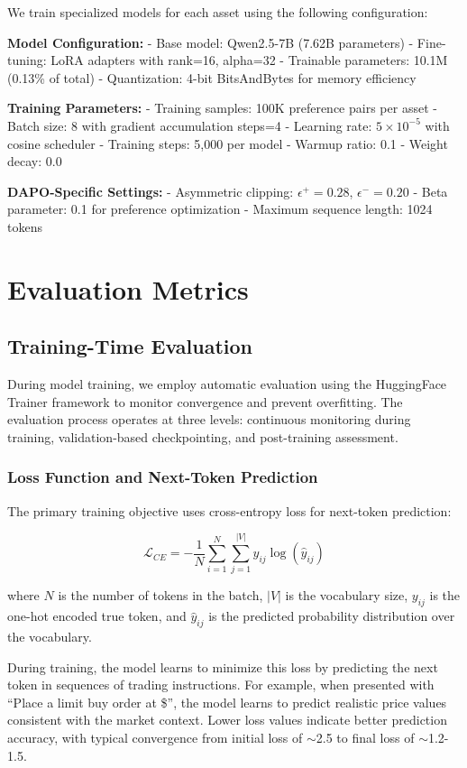 \documentclass{report}
\begin{document}
We train specialized models for each asset using the following configuration:

\textbf{Model Configuration:}
- Base model: Qwen2.5-7B (7.62B parameters)
- Fine-tuning: LoRA adapters with rank=16, alpha=32
- Trainable parameters: 10.1M (0.13\% of total)
- Quantization: 4-bit BitsAndBytes for memory efficiency

\textbf{Training Parameters:}
- Training samples: 100K preference pairs per asset
- Batch size: 8 with gradient accumulation steps=4
- Learning rate: $5 \times 10^{-5}$ with cosine scheduler
- Training steps: 5,000 per model
- Warmup ratio: 0.1
- Weight decay: 0.0

\textbf{DAPO-Specific Settings:}
- Asymmetric clipping: $\epsilon^+ = 0.28$, $\epsilon^- = 0.20$
- Beta parameter: 0.1 for preference optimization
- Maximum sequence length: 1024 tokens

\section{Evaluation Metrics}

\subsection{Training-Time Evaluation}

During model training, we employ automatic evaluation using the HuggingFace Trainer framework to monitor convergence and prevent overfitting. The evaluation process operates at three levels: continuous monitoring during training, validation-based checkpointing, and post-training assessment.

\subsubsection{Loss Function and Next-Token Prediction}

The primary training objective uses cross-entropy loss for next-token prediction:

\begin{equation}
\mathcal{L}_{CE} = -\frac{1}{N} \sum_{i=1}^{N} \sum_{j=1}^{|V|} y_{ij} \log(\hat{y}_{ij})
\end{equation}

where $N$ is the number of tokens in the batch, $|V|$ is the vocabulary size, $y_{ij}$ is the one-hot encoded true token, and $\hat{y}_{ij}$ is the predicted probability distribution over the vocabulary.

During training, the model learns to minimize this loss by predicting the next token in sequences of trading instructions. For example, when presented with ``Place a limit buy order at \$'', the model learns to predict realistic price values consistent with the market context. Lower loss values indicate better prediction accuracy, with typical convergence from initial loss of $\sim$2.5 to final loss of $\sim$1.2-1.5.
\end{document}
